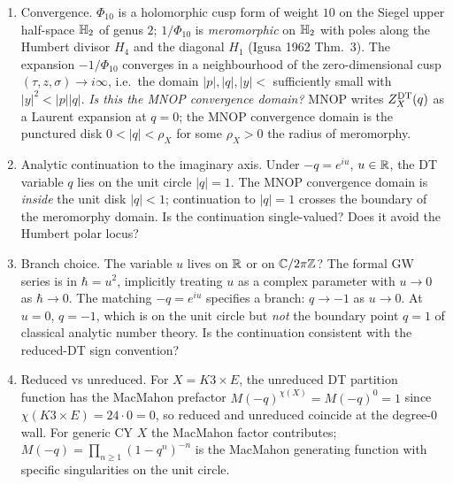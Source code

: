 \begin{enumerate}[label=\textbf{O.\arabic*},leftmargin=1.5em]
\item Convergence. $\Phi_{10}$ is a holomorphic cusp form of
  weight $10$ on the Siegel upper half-space $\mathbb{H}_2$ of genus
  $2$; $1/\Phi_{10}$ is \emph{meromorphic} on $\mathbb{H}_2$ with poles
  along the Humbert divisor $H_4$ and the diagonal $H_1$ (Igusa
  1962 Thm.\ 3). The expansion $-1/\Phi_{10}$ converges in a
  neighbourhood of the zero-dimensional cusp
  $(\tau,z,\sigma)\to i\infty$, i.e.\ the domain $|p|,|q|,|y|<$
  sufficiently small with $|y|^2<|p||q|$. \emph{Is this the MNOP
  convergence domain?} MNOP writes $Z^{\mathrm{DT}}_X(q)$ as a Laurent
  expansion at $q=0$; the MNOP convergence domain is the punctured
  disk $0<|q|<\rho_X$ for some $\rho_X>0$ the radius of
  meromorphy.
\item Analytic continuation to the imaginary axis. Under
  $-q=e^{iu}$, $u\in\mathbb{R}$, the DT variable $q$ lies on the unit
  circle $|q|=1$. The MNOP convergence domain is \emph{inside}
  the unit disk $|q|<1$; continuation to $|q|=1$ crosses the
  boundary of the meromorphy domain. Is the continuation
  single-valued? Does it avoid the Humbert polar locus?
\item Branch choice. The variable $u$ lives on $\mathbb{R}$ or on
  $\mathbb{C}/2\pi\mathbb{Z}$? The formal GW series is in $\hbar=u^2$, implicitly
  treating $u$ as a complex parameter with $u\to 0$ as
  $\hbar\to 0$. The matching $-q=e^{iu}$ specifies a branch:
  $q\to -1$ as $u\to 0$. At $u=0$, $q=-1$, which is on the unit
  circle but \emph{not} the boundary point $q=1$ of classical
  analytic number theory. Is the continuation consistent with
  the reduced-DT sign convention?
\item Reduced vs unreduced. For $X=K3\times E$, the unreduced DT
  partition function has the MacMahon prefactor
  $M(-q)^{\chi(X)}=M(-q)^0=1$ since $\chi(K3\times E)=24\cdot 0=0$,
  so reduced and unreduced coincide at the degree-$0$ wall.
  For generic CY $X$ the MacMahon factor contributes;
  $M(-q)=\prod_{n\ge 1}(1-q^n)^{-n}$ is the MacMahon generating
  function with specific singularities on the unit circle.
\end{enumerate}

